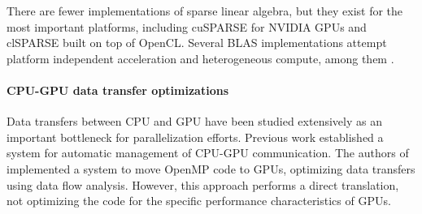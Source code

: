     There are fewer implementations of sparse linear algebra, but they exist for
    the most important platforms, including cuSPARSE \cite{cusparse} for NVIDIA
    GPUs and clSPARSE \cite{clsparse} built on top of OpenCL.
    Several BLAS implementations attempt platform independent acceleration and
    heterogeneous compute, among them \citet{Wang:2016:BHP:2925426.2926256,
    10.1007/978-3-319-64203-1_33, Diego2017Multi}. 



\paragraph*{CPU-GPU data transfer optimizations}
    Data transfers between CPU and GPU have been studied extensively as an
    important
    bottleneck for parallelization efforts.
    Previous work \cite{Jablin:2011:ACC:1993316.1993516} established a system for
    automatic management of CPU-GPU communication.
    The authors of \cite{Lee:2009:OGC:1594835.1504194} implemented a system to
    move OpenMP code to GPUs, optimizing data transfers using data flow analysis.
    However, this approach performs a direct translation, not optimizing the code
    for the specific performance characteristics of GPUs.


